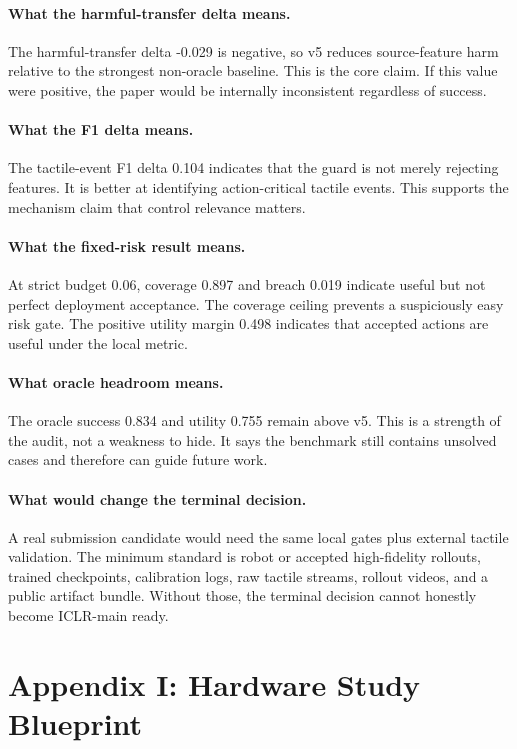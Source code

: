 \documentclass{article}
\begin{document}
\paragraph{What the harmful-transfer delta means.}
The harmful-transfer delta -0.029 is negative, so v5 reduces source-feature harm relative to the strongest non-oracle baseline. This is the core claim. If this value were positive, the paper would be internally inconsistent regardless of success.

\paragraph{What the F1 delta means.}
The tactile-event F1 delta 0.104 indicates that the guard is not merely rejecting features. It is better at identifying action-critical tactile events. This supports the mechanism claim that control relevance matters.

\paragraph{What the fixed-risk result means.}
At strict budget 0.06, coverage 0.897 and breach 0.019 indicate useful but not perfect deployment acceptance. The coverage ceiling prevents a suspiciously easy risk gate. The positive utility margin 0.498 indicates that accepted actions are useful under the local metric.

\paragraph{What oracle headroom means.}
The oracle success 0.834 and utility 0.755 remain above v5. This is a strength of the audit, not a weakness to hide. It says the benchmark still contains unsolved cases and therefore can guide future work.

\paragraph{What would change the terminal decision.}
A real submission candidate would need the same local gates plus external tactile validation. The minimum standard is robot or accepted high-fidelity rollouts, trained checkpoints, calibration logs, raw tactile streams, rollout videos, and a public artifact bundle. Without those, the terminal decision cannot honestly become ICLR-main ready.

\clearpage
\section{Appendix I: Hardware Study Blueprint}
\end{document}
